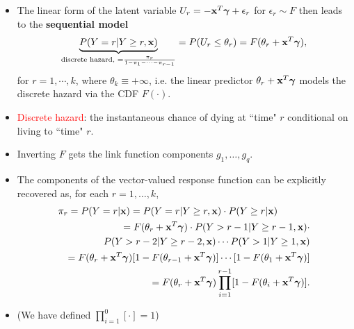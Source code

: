 \documentclass{beamer}
\newenvironment{wideitemize}%
  {\begin{itemize}%
    \setlength{\parskip}{1em}}%
  {\end{itemize}}
\begin{document}
\begin{frame}
\begin{wideitemize}
\item

The linear form of the latent variable $U_r = - {\bf x}^T {\boldsymbol \gamma} + \epsilon_r$ for $\epsilon_r \sim F$
then leads to the \textbf{sequential model}
\begin{equation*}
\underbrace{P(Y=r|Y\geq r, \textbf{x})}_{\text{discrete hazard, } = \frac{\pi_r}{1 - \pi_1 - \dots - \pi_{r-1}}}= 
P(U_r\leq \theta_r)=F(\theta_r+\textbf{x}^T\mbox{\boldmath $\gamma$}), 
\label{eq-3.3.17}
\end{equation*}
for $r=1,\cdots,k$, where $\theta_k\equiv +\infty$, i.e. the linear predictor $\theta_r+\textbf{x}^T\mbox{\boldmath $\gamma$}$ models the discrete hazard  via the CDF $F(\cdot)$.


\item \textcolor{red}{Discrete hazard}: the instantaneous chance of dying at ``time" $r$ conditional on living to ``time" $r$.
\item Inverting $F$  gets the  link function components $g_1, \dots, g_q$. 
\end{wideitemize}
\end{frame}

\begin{frame}
\begin{itemize}
\item The components of the vector-valued response function can be explicitly recovered as, for each $r = 1, \dots, k$,
{\footnotesize
\begin{eqnarray*}
\lefteqn{\pi_r= P(Y=r|\textbf{x})=P(Y=r|Y\geq r, \textbf{x})\cdot P(Y\geq r |\textbf{x})} & \\
& & =F(\theta_r+\textbf{x}^T\mbox{\boldmath $\gamma$}) \cdot P(Y>r-1|Y\geq r-1, \textbf{x}) \cdot \\
& & \quad\quad \quad P(Y>r-2|Y\geq r-2, \textbf{x})\cdots P(Y>1|Y\geq 1, \textbf{x}) \\
&&=F(\theta_r+\textbf{x}^T\mbox{\boldmath $\gamma$})[1-F(\theta_{r-1}+\textbf{x}^T\mbox{\boldmath $\gamma$})]
\cdots [1-F(\theta_1+\textbf{x}^T\mbox{\boldmath $\gamma$})] \\
&& = F(\theta_r+\textbf{x}^T\mbox{\boldmath $\gamma$})\prod_{i=1}^{r-1}
[1-F(\theta_i+\textbf{x}^T\mbox{\boldmath $\gamma$})].
\end{eqnarray*}
}
\item (We have defined $\prod_{i=1}^0 [\cdot]=1$)
\end{itemize}

\end{frame}
\end{document}
